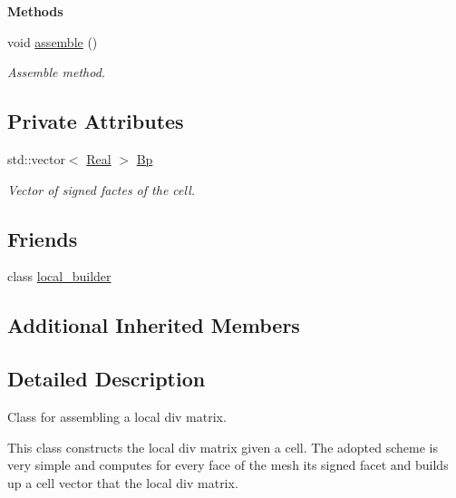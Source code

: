 \begin{Indent}{\bf Methods}\par
\begin{DoxyCompactItemize}
\item 
void \hyperlink{classFVCode3D_1_1local__Div_a36cda0a641aa6c4de76a3e5852436d86}{assemble} ()
\begin{DoxyCompactList}\small\item\em Assemble method. \end{DoxyCompactList}\end{DoxyCompactItemize}
\end{Indent}
\subsection*{Private Attributes}
\begin{DoxyCompactItemize}
\item 
std\+::vector$<$ \hyperlink{namespaceFVCode3D_a40c1f5588a248569d80aa5f867080e83}{Real} $>$ \hyperlink{classFVCode3D_1_1local__Div_a43a4652e156243c0f8c82af161ab0b8f}{Bp}
\begin{DoxyCompactList}\small\item\em Vector of signed factes of the cell. \end{DoxyCompactList}\end{DoxyCompactItemize}
\subsection*{Friends}
\begin{DoxyCompactItemize}
\item 
class \hyperlink{classFVCode3D_1_1local__Div_abcd35ed5f4c4c65e5aee0132d25150ff}{local\+\_\+builder}
\end{DoxyCompactItemize}
\subsection*{Additional Inherited Members}


\subsection{Detailed Description}
Class for assembling a local div matrix. 

This class constructs the local div matrix given a cell. The adopted scheme is very simple and computes for every face of the mesh its signed facet and builds up a cell vector that the local div matrix. 

